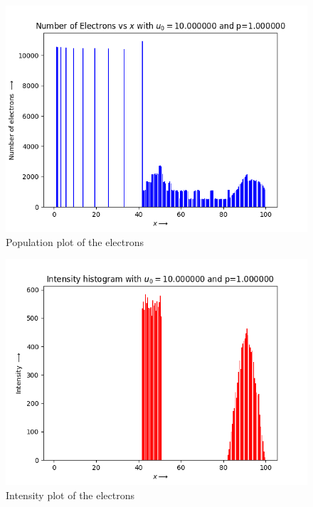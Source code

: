 \documentclass[11pt, a4paper]{article}
\begin{document}
\begin{figure}[!tbh]
\centering
\includegraphics[scale=0.56]{hist4_elec_density.png} 
\caption{Population plot of the electrons}
\label{fig:3fig_1}
\end{figure} 

\begin{figure}[!tbh]
\centering
\includegraphics[scale=0.56]{hist4_intensity.png} 
\caption{Intensity plot of the electrons}
\label{fig:3fig_2}
\end{figure} 
\end{document}
